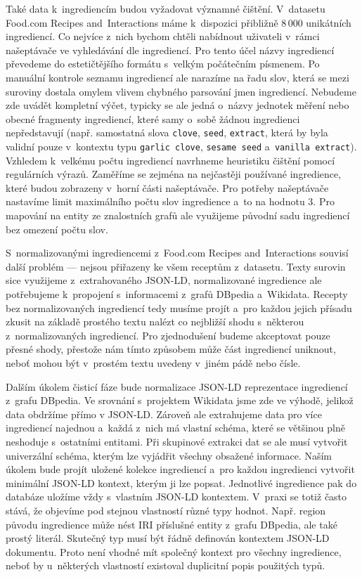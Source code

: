 Také data k~ingrediencím budou vyžadovat významné čištění. V~datasetu Food.com Recipes and~Interactions máme k~dispozici přibližně $8\,000$ unikátních ingrediencí. Co nejvíce z~nich bychom chtěli nabídnout uživateli v~rámci našeptávače ve vyhledávání dle ingrediencí. Pro tento účel názvy ingrediencí převedeme do estetičtějšího formátu s~velkým počátečním písmenem. Po manuální kontrole seznamu ingrediencí ale narazíme na řadu slov, která se mezi suroviny dostala omylem vlivem chybného parsování jmen ingrediencí. Nebudeme zde uvádět kompletní výčet, typicky se ale jedná o~názvy jednotek měření nebo obecné fragmenty ingrediencí, které samy o~sobě žádnou ingredienci nepředstavují (např. samostatná slova \texttt{clove}, \texttt{seed}, \texttt{extract}, která by byla validní pouze v~kontextu typu \texttt{garlic clove}, \texttt{sesame seed} a~\texttt{vanilla extract}). Vzhledem k~velkému počtu ingrediencí navrhneme heuristiku čištění pomocí regulárních výrazů. Zaměříme se zejména na nejčastěji používané ingredience, které budou zobrazeny v~horní části našeptávače. Pro potřeby našeptávače nastavíme limit maximálního počtu slov ingredience a~to na hodnotu $3$. Pro mapování na entity ze znalostních grafů ale využijeme původní sadu ingrediencí bez omezení počtu slov.

S~normalizovanými ingrediencemi z~Food.com Recipes and~Interactions souvisí další problém --- nejsou přiřazeny ke všem receptům z~datasetu. Texty surovin sice využijeme z~extrahovaného JSON-LD, normalizované ingredience ale potřebujeme k~propojení s~informacemi z~grafů DBpedia a~Wikidata. Recepty bez normalizovaných ingrediencí tedy musíme projít a~pro každou jejich přísadu zkusit na základě prostého textu nalézt co nejbližší shodu s~některou z~normalizovaných ingrediencí. Pro zjednodušení budeme akceptovat pouze přesné shody, přestože nám tímto způsobem může část ingrediencí uniknout, neboť mohou být v~prostém textu uvedeny v~jiném pádě nebo čísle.

Dalším úkolem čisticí fáze bude normalizace JSON-LD reprezentace ingrediencí z~grafu DBpedia. Ve srovnání s~projektem Wikidata jsme zde ve výhodě, jelikož data obdržíme přímo v JSON-LD. Zároveň ale extrahujeme data pro více ingrediencí najednou a~každá z~nich má vlastní schéma, které se většinou plně neshoduje s~ostatními entitami. Při skupinové extrakci dat se ale musí vytvořit univerzální schéma, kterým lze vyjádřit všechny obsažené informace. Naším úkolem bude projít uložené kolekce ingrediencí a~pro každou ingredienci vytvořit minimální JSON-LD kontext, kterým ji lze popsat. Jednotlivé ingredience pak do databáze uložíme vždy s~vlastním JSON-LD kontextem. V~praxi se totiž často stává, že objevíme pod stejnou vlastností různé typy hodnot. Např. region původu ingredience může nést IRI příslušné entity z~grafu DBpedia, ale také prostý literál. Skutečný typ musí být řádně definován kontextem JSON-LD dokumentu. Proto není vhodné mít společný kontext pro všechny ingredience, neboť by u~některých vlastností existoval duplicitní popis použitých typů.

